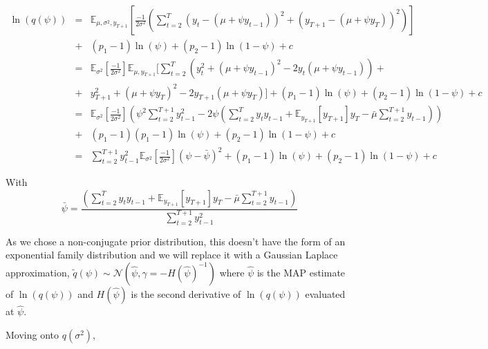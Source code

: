 \documentclass{article}
\begin{document}
\begin{eqnarray*}
\label{qpsi}
\ln(q(\psi)) & = &  \mathbb{E}_{\mu, \sigma^2, y_{T+1}} \left[ \frac{-1}{2\sigma^2} \left(\sum^{T}_{t=2}(y_t-(\mu+\psi y_{t-1}))^2 + (y_{T+1}-(\mu+\psi y_T))^2 \right) \right] \\
& +  & (p_1-1) \ln(\psi) + (p_2-1)\ln(1-\psi) + c \\
& = & \mathbb{E}_{\sigma^2} \left[ \frac{-1}{2\sigma^2} \right] \mathbb{E}_{\mu, y_{T+1}} \Bigg[ \sum^{T}_{t=2} (y_t^2 + (\mu+\psi y_{t-1})^2 - 2 y_t (\mu+\psi y_{t-1})) + \\
& + & y_{T+1}^2 +  (\mu+\psi y_T)^2 - 2 y_{T+1}(\mu+\psi y_T)\Bigg] + (p_1-1) \ln(\psi) + (p_2-1)\ln(1-\psi) + c \\
& = & \mathbb{E}_{\sigma^2} \left[ \frac{-1}{2\sigma^2} \right] \left(\psi^2 \sum^{T+1}_{t=2} y_{t-1}^2 - 2\psi \left( \sum^{T}_{t=2} y_t y_{t-1} + \mathbb{E}_{y_{T+1}} [y_{T+1}]y_T - \bar{\mu}\sum^{T+1}_{t=2} y_{t-1} \right) \right) \\
& + & (p_1-1) (p_1-1) \ln(\psi) + (p_2-1)\ln(1-\psi) + c \\
& = & \sum^{T+1}_{t=2} y_{t-1}^2  \mathbb{E}_{\sigma^2} \left[ \frac{-1}{2\sigma^2} \right] \left(\psi - \bar{\psi} \right)^2 + (p_1-1) \ln(\psi) + (p_2-1)\ln(1-\psi) + c
\end{eqnarray*}

With $$\bar{\psi} = \frac{\left(\sum^{T}_{t=2} y_t y_{t-1} + \mathbb{E}_{y_{T+1}} [y_{T+1}]y_T - \bar{\mu} \sum^{T+1}_{t=2} y_{t-1} \right)}{\sum^{T+1}_{t=2} y_{t-1}^2}$$

As we chose a non-conjugate prior distribution, this doesn't have the form of an exponential family distribution and we will replace it with a Gaussian Laplace approximation, $\tilde{q}(\psi) \sim \mathcal{N}(\hat{\psi}, \gamma = -H(\hat{\psi})^{-1})$ where $\hat{\psi}$ is the MAP estimate of $\ln(q(\psi))$ and $H(\hat{\psi})$ is the second derivative of $\ln(q(\psi))$ evaluated at $\hat{\psi}$.

Moving onto $q(\sigma^2)$,
\end{document}
